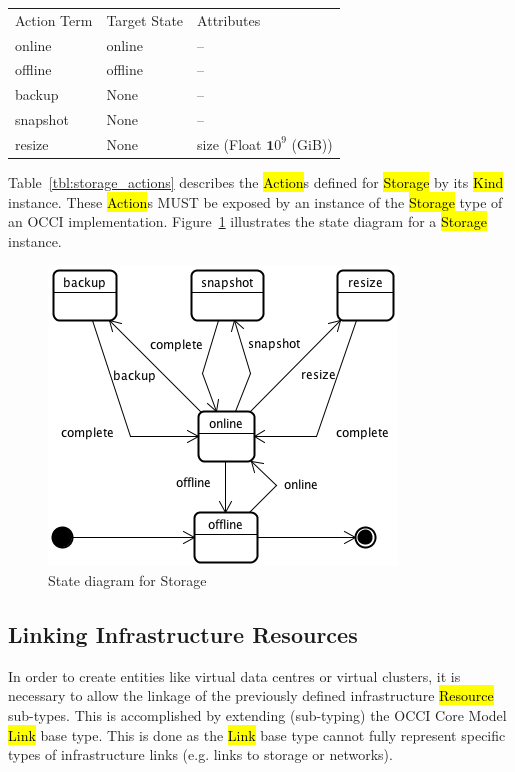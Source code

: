 \documentclass[10pt,a4paper]{article}
\begin{document}
{
	\begin{tabular}{lll}
	\toprule
	Action Term&Target State&Attributes\\
	\colrule
	online & online & --\\
	offline & offline & --\\
	backup & None & --\\
	snapshot & None & --\\
	resize & None & size (Float  ${\mathbf 10}^9$ (GiB))
	\end{tabular}
}

Table~\ref{tbl:storage_actions} describes the \hl{Action}s defined for
\hl{Storage} by its \hl{Kind} instance. These \hl{Action}s MUST be exposed 
by an instance of the \hl{Storage} type of an OCCI implementation. 
Figure~\ref{fig:storage_state} illustrates the state diagram for a \hl{Storage} instance.

\begin{figure}[!h]
	\centering
	\includegraphics[scale=0.4]{figs/storage-state.png}
	\caption{State diagram for Storage}
	\label{fig:storage_state}
\end{figure}

\subsection{Linking Infrastructure Resources}
In order to create entities like virtual data centres or virtual clusters, it is necessary to allow the linkage of the previously defined infrastructure \hl{Resource} sub-types. This is accomplished by extending (sub-typing) the OCCI Core Model \hl{Link} base type. This is done as the \hl{Link} base type cannot fully represent specific types of infrastructure links (e.g. links to storage or networks).
\end{document}
